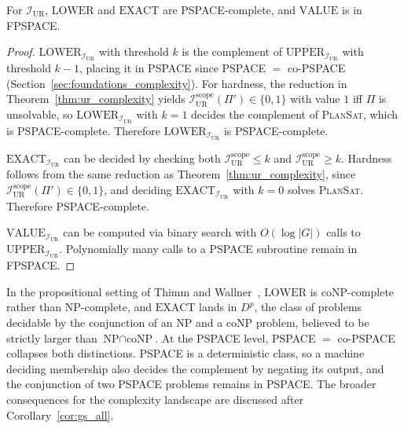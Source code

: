 \begin{cor}
    \label{cor:ur_all}
    For $\mathcal{I}_{\text{UR}}$, $\text{LOWER}$ and $\text{EXACT}$ are PSPACE-complete, and $\text{VALUE}$ is in FPSPACE.
\end{cor}
\begin{proof}
    $\text{LOWER}_{\mathcal{I}_{\text{UR}}}$ with threshold $k$ is the complement of $\text{UPPER}_{\mathcal{I}_{\text{UR}}}$ with threshold $k - 1$, placing it in PSPACE since PSPACE $=$ co-PSPACE (Section~\ref{sec:foundations_complexity}). For hardness, the reduction in Theorem~\ref{thm:ur_complexity} yields $\mathcal{I}^{\text{scope}}_{\text{UR}}(\Pi') \in \{0, 1\}$ with value $1$ iff $\Pi$ is unsolvable, so $\text{LOWER}_{\mathcal{I}_{\text{UR}}}$ with $k = 1$ decides the complement of \textsc{PlanSat}, which is PSPACE-complete. Therefore $\text{LOWER}_{\mathcal{I}_{\text{UR}}}$ is PSPACE-complete.

    $\text{EXACT}_{\mathcal{I}_{\text{UR}}}$ can be decided by checking both $\mathcal{I}^{\text{scope}}_{\text{UR}} \leq k$ and $\mathcal{I}^{\text{scope}}_{\text{UR}} \geq k$. Hardness follows from the same reduction as Theorem~\ref{thm:ur_complexity}, since $\mathcal{I}^{\text{scope}}_{\text{UR}}(\Pi') \in \{0, 1\}$, and deciding $\text{EXACT}_{\mathcal{I}_{\text{UR}}}$ with $k = 0$ solves \textsc{PlanSat}. Therefore PSPACE-complete.

    $\text{VALUE}_{\mathcal{I}_{\text{UR}}}$ can be computed via binary search with $O(\log |G|)$ calls to $\text{UPPER}_{\mathcal{I}_{\text{UR}}}$. Polynomially many calls to a PSPACE subroutine remain in FPSPACE.
\end{proof}

In the propositional setting of Thimm and Wallner~\cite{Thimm2016}, $\text{LOWER}$ is coNP-complete rather than NP-complete, and $\text{EXACT}$ lands in $D^p$, the class of problems decidable by the conjunction of an NP and a coNP problem, believed to be strictly larger than $\text{NP} \cap \text{coNP}$. At the PSPACE level, PSPACE $=$ co-PSPACE collapses both distinctions. PSPACE is a deterministic class, so a machine deciding membership also decides the complement by negating its output, and the conjunction of two PSPACE problems remains in PSPACE. The broader consequences for the complexity landscape are discussed after Corollary~\ref{cor:gs_all}.

